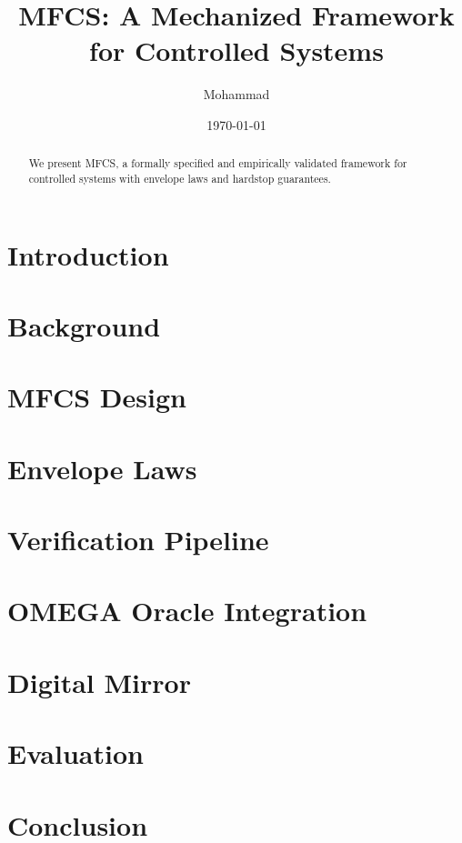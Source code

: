 \documentclass{article}
\title{MFCS: A Mechanized Framework for Controlled Systems}
\author{Mohammad}
\date{\today}
\begin{document}
\maketitle

\begin{abstract}
We present MFCS, a formally specified and empirically validated framework
for controlled systems with envelope laws and hardstop guarantees.
\end{abstract}

\section{Introduction}

\section{Background}

\section{MFCS Design}

\section{Envelope Laws}

\section{Verification Pipeline}

\section{OMEGA Oracle Integration}

\section{Digital Mirror}

\section{Evaluation}

\section{Conclusion}
\end{document}
